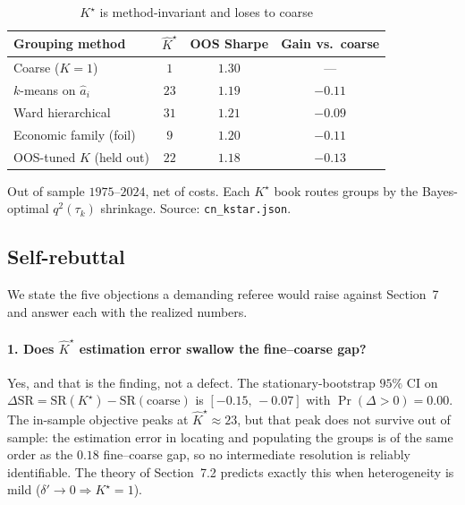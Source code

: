 \documentclass[12pt]{article}
\theoremstyle{plain}
\theoremstyle{definition}
\begin{document}
\begin{table}[t]
\centering
\caption{$K^\star$ is method-invariant and loses to coarse}
\label{tab:iakstar}
\begin{threeparttable}
\begin{tabular}{lccc}
\toprule
Grouping method & $\hat K^\star$ & OOS Sharpe & Gain vs.\ coarse \\
\midrule
Coarse ($K=1$)              & $1$  & $1.30$ & --- \\
$k$-means on $\hat a_i$     & $23$ & $1.19$ & $-0.11$ \\
Ward hierarchical          & $31$ & $1.21$ & $-0.09$ \\
Economic family (foil)     & $9$  & $1.20$ & $-0.11$ \\
OOS-tuned $K$ (held out)   & $22$ & $1.18$ & $-0.13$ \\
\bottomrule
\end{tabular}
\begin{tablenotes}\footnotesize
\item Out of sample $1975$--$2024$, net of costs. Each $K^\star$ book routes
groups by the Bayes-optimal $q^2(\tau_k)$ shrinkage. Source:
\texttt{cn\_kstar.json}.
\end{tablenotes}
\end{threeparttable}
\end{table}
\subsection{Self-rebuttal}
\label{ia:rebuttal}

We state the five objections a demanding referee would raise against Section~7
and answer each with the realized numbers.

\paragraph{1. Does $\hat K^\star$ estimation error swallow the fine--coarse gap?}
Yes, and that is the finding, not a defect. The stationary-bootstrap $95\%$ CI on
$\Delta\mathrm{SR}=\mathrm{SR}(K^\star)-\mathrm{SR}(\text{coarse})$ is
$[-0.15,\,-0.07]$ with $\Pr(\Delta>0)=0.00$. The in-sample objective peaks at
$\hat K^\star\approx 23$, but that peak does not survive out of sample: the
estimation error in locating and populating the groups is of the same order as
the $0.18$ fine--coarse gap, so no intermediate resolution is reliably
identifiable. The theory of Section~7.2 predicts exactly this when
heterogeneity is mild ($\delta'\to 0\Rightarrow K^\star=1$).
\end{document}
